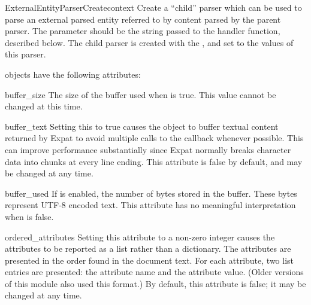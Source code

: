 \begin{methoddesc}[xmlparser]{ExternalEntityParserCreate}{context}
Create a ``child'' parser which can be used to parse an external
parsed entity referred to by content parsed by the parent parser.  The
 parameter should be the string passed to the
 handler function, described below.
The child parser is created with the ,
 and  set to the
values of this parser.
\end{methoddesc}


 objects have the following attributes:

\begin{memberdesc}[xmlparser]{buffer_size}
The size of the buffer used when  is true.  This
value cannot be changed at this time.
\end{memberdesc}

\begin{memberdesc}[xmlparser]{buffer_text}
Setting this to true causes the  object to buffer
textual content returned by Expat to avoid multiple calls to the
 callback whenever possible.  This can
improve performance substantially since Expat normally breaks
character data into chunks at every line ending.  This attribute is
false by default, and may be changed at any time.
\end{memberdesc}

\begin{memberdesc}[xmlparser]{buffer_used}
If  is enabled, the number of bytes stored in the
buffer.  These bytes represent UTF-8 encoded text.  This attribute has
no meaningful interpretation when  is false.
\end{memberdesc}

\begin{memberdesc}[xmlparser]{ordered_attributes}
Setting this attribute to a non-zero integer causes the attributes to
be reported as a list rather than a dictionary.  The attributes are
presented in the order found in the document text.  For each
attribute, two list entries are presented: the attribute name and the
attribute value.  (Older versions of this module also used this
format.)  By default, this attribute is false; it may be changed at
any time.
\end{memberdesc}

